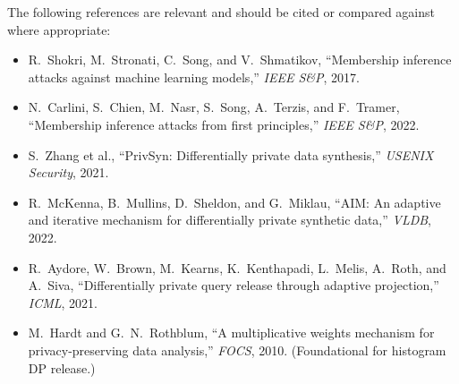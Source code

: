 \documentclass[12pt]{article}
\begin{document}
The following references are relevant and should be cited or compared against where appropriate:

\begin{itemize}
  \item R.\ Shokri, M.\ Stronati, C.\ Song, and V.\ Shmatikov, ``Membership inference attacks against machine learning models,'' \textit{IEEE S\&P}, 2017.
  \item N.\ Carlini, S.\ Chien, M.\ Nasr, S.\ Song, A.\ Terzis, and F.\ Tramer, ``Membership inference attacks from first principles,'' \textit{IEEE S\&P}, 2022.
  \item S.\ Zhang et al., ``PrivSyn: Differentially private data synthesis,'' \textit{USENIX Security}, 2021.
  \item R.\ McKenna, B.\ Mullins, D.\ Sheldon, and G.\ Miklau, ``AIM: An adaptive and iterative mechanism for differentially private synthetic data,'' \textit{VLDB}, 2022.
  \item R.\ Aydore, W.\ Brown, M.\ Kearns, K.\ Kenthapadi, L.\ Melis, A.\ Roth, and A.\ Siva, ``Differentially private query release through adaptive projection,'' \textit{ICML}, 2021.
  \item M.\ Hardt and G.\ N.\ Rothblum, ``A multiplicative weights mechanism for privacy-preserving data analysis,'' \textit{FOCS}, 2010. (Foundational for histogram DP release.)
\end{itemize}
\end{document}

